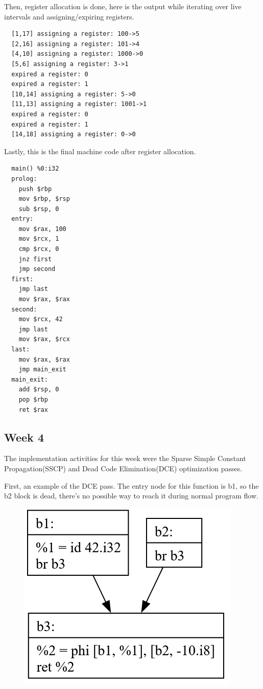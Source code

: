 \documentclass[11pt, a4paper, titlepage]{article}
\begin{document}
Then, register allocation is done,
here is the output while iterating over live intervals and assigning/expiring registers.

\begin{lstlisting}
  [1,17] assigning a register: 100->5
  [2,16] assigning a register: 101->4
  [4,10] assigning a register: 1000->0
  [5,6] assigning a register: 3->1
  expired a register: 0
  expired a register: 1
  [10,14] assigning a register: 5->0
  [11,13] assigning a register: 1001->1
  expired a register: 0
  expired a register: 1
  [14,18] assigning a register: 0->0
\end{lstlisting}

Lastly, this is the final machine code after register allocation.

\begin{lstlisting}
  main() %0:i32
  prolog:
    push $rbp
    mov $rbp, $rsp
    sub $rsp, 0
  entry:
    mov $rax, 100
    mov $rcx, 1
    cmp $rcx, 0
    jnz first
    jmp second
  first:
    jmp last
    mov $rax, $rax
  second:
    mov $rcx, 42
    jmp last
    mov $rax, $rcx
  last:
    mov $rax, $rax
    jmp main_exit
  main_exit:
    add $rsp, 0
    pop $rbp
    ret $rax
\end{lstlisting}

\subsection{Week 4}

The implementation activities for this week were the Sparse Simple Constant Propagation(SSCP) and Dead Code Elimination(DCE) optimization passes.

First, an example of the DCE pass. The entry node for this function is b1, so the b2 block is dead, there's no possible way to reach it during normal program flow.

\begin{figure}[H]
  \centering
  \includegraphics[scale=0.3]{images/i7.png}
\end{figure}
\end{document}
